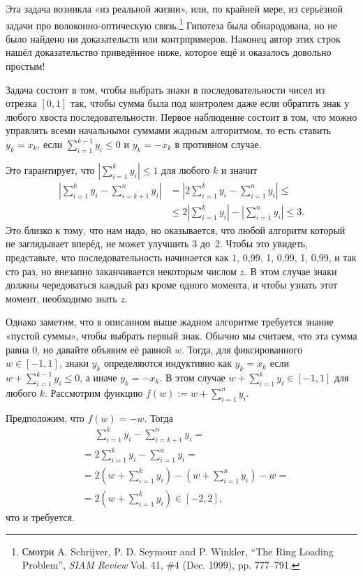 Эта задача возникла «из реальной жизни», или, по крайней мере, из серьёзной задачи про волоконно-оптическую связь.\footnote{Смотри A. Schrijver, P. D. Seymour and P. Winkler, ``The Ring Loading Problem'', \emph{SIAM Review} Vol. 41, \#4 (Dec. 1999), pp. 777--791.}
Гипотеза была обнародована, но не было найдено ни доказательств или контрпримеров.
Наконец автор этих строк нашёл доказательство приведённое ниже, которое ещё и оказалось довольно простым!

Задача состоит в том, чтобы выбрать знаки в последовательности чисел из отрезка $[0,1]$ так, чтобы сумма была под контролем даже если обратить знак у любого хвоста последовательности.
Первое наблюдение состоит в том, что можно управлять всеми начальными суммами жадным алгоритмом, то есть ставить $y_k=x_k$, если $\sum_{i=1}^{k-1}y_i \le 0$ и $y_k=-x_k$ в противном случае.

Это гарантирует, что $\left|\sum_{i=1}^{k}y_i\right| \le 1$ для любого $k$ и значит
\begin{align*}
\left|\sum_{i=1}^{k}y_i-\sum_{i=k+1}^{n}y_i\right|&=\left|2\sum_{i=1}^{k}y_i-\sum_{i=1}^{n}y_i\right|\le
\\
&\le2\left|\sum_{i=1}^{k}y_i\right|-\left|\sum_{i=1}^{n}y_i\right|\le3.
\end{align*}
Это близко к тому, что нам надо, но оказывается, что любой алгоритм который не заглядывает вперёд, не может улучшить 3 до~2.
Чтобы это увидеть, представьте, что последовательность начинается как
1, 0,99, 1, 0,99, 1, 0,99, и так сто раз, но внезапно заканчивается некоторым числом $z$.
В этом случае знаки должны чередоваться каждый раз кроме одного момента, и чтобы узнать этот момент, необходимо знать $z$.

Однако заметим, что в описанном выше жадном алгоритме требуется знание «пустой суммы», чтобы выбрать первый знак.
Обычно мы считаем, что эта сумма равна 0, но давайте объявим её равной $w$.
Тогда, для фиксированного $w\in [-1,1]$, знаки $y_k$ определяются индуктивно как $y_k=x_k$ если $w+\sum_{i=1}^{k-1}y_i \le 0$, а иначе $y_k=-x_k$.
В этом случае $w+\sum_{i=1}^{k}y_i \in[-1,1]$ для любого $k$.
Рассмотрим функцию $f(w) \mathop{{:}{=}} w+\sum_{i=1}^ny_i$. %

Предположим, что $f(w)=-w$.
Тогда
\begin{align*}
&\phantom{=}\sum_{i=1}^{k}y_i-\sum_{i=k+1}^{n}y_i=
\\
&=2\sum_{i=1}^{k}y_i-\sum_{i=1}^{n}y_i=
\\
&=2\left(w+\sum_{i=1}^{k}y_i\right)-\left(w+\sum_{i=1}^{n}y_i\right)-w=
\\
&=2\left(w+\sum_{i=1}^{k}y_i\right)\in[-2,2],
\end{align*}
что и требуется.

